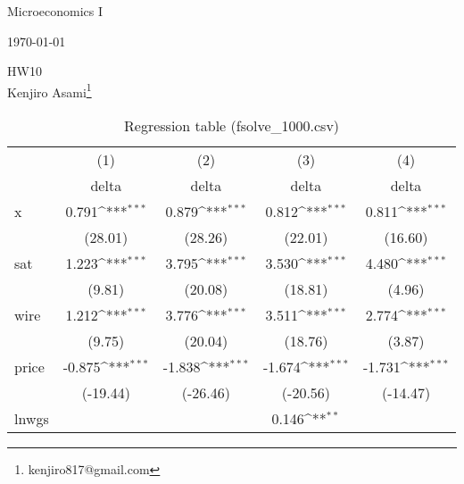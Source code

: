 \documentclass[a4paper, 12pt]{article}
\theoremstyle{definition}
\begin{document}
\vspace*{-2.5cm}
\begin{flushright}
	{Microeconomics I}
\end{flushright}
\vspace*{-0.7cm}
\begin{flushright}
	{\small \today}
\end{flushright}
\renewcommand{\thefootnote}{\fnsymbol{footnote}}
\begin{center}
	\vspace*{2truept}
	{\LARGE HW10}\\ %
	\vspace*{10truept}
	{\large Kenjiro Asami\footnote{kenjiro817@gmail.com}}
\end{center}
\renewcommand{\thefootnote}{\arabic{footnote}}
\setcounter{footnote}{0}
\begin{table}[htbp]\centering
	\def\sym#1{\ifmmode^{#1}\else\(^{#1}\)\fi}
	\caption{Regression table (fsolve\_1000.csv)\label{tab1}}
	\begin{tabular}{l*{4}{c}}
		\hline\hline
		&\multicolumn{1}{c}{(1)}&\multicolumn{1}{c}{(2)}&\multicolumn{1}{c}{(3)}&\multicolumn{1}{c}{(4)}\\
		&\multicolumn{1}{c}{delta}&\multicolumn{1}{c}{delta}&\multicolumn{1}{c}{delta}&\multicolumn{1}{c}{delta}\\
		\hline
		x                   &       0.791\sym{***}&       0.879\sym{***}&       0.812\sym{***}&       0.811\sym{***}\\
		&     (28.01)         &     (28.26)         &     (22.01)         &     (16.60)         \\
		[1em]
		sat                 &       1.223\sym{***}&       3.795\sym{***}&       3.530\sym{***}&       4.480\sym{***}\\
		&      (9.81)         &     (20.08)         &     (18.81)         &      (4.96)         \\
		[1em]
		wire                &       1.212\sym{***}&       3.776\sym{***}&       3.511\sym{***}&       2.774\sym{***}\\
		&      (9.75)         &     (20.04)         &     (18.76)         &      (3.87)         \\
		[1em]
		price               &      -0.875\sym{***}&      -1.838\sym{***}&      -1.674\sym{***}&      -1.731\sym{***}\\
		&    (-19.44)         &    (-26.46)         &    (-20.56)         &    (-14.47)         \\
		[1em]
		lnwgs               &                     &                     &       0.146\sym{**} &                     \\

\end{tabular}
\end{table}
\end{document}
